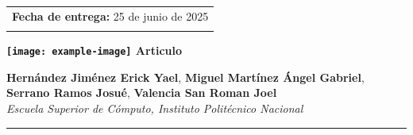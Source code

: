\documentclass[pdflatex,sn-mathphys-num]{sn-jnl}%
\theoremstyle{thmstyleone}%
\theoremstyle{thmstyletwo}%
\theoremstyle{thmstylethree}%
\begin{document}
\makeatletter
\def\@title{\parbox[t]{\textwidth}{\justifying\LARGE\bfseries Asistente inteligente de riego en tiempo real usando machine learning en un sistema embebido para reducir los costos por consumo de agua}}
\makeatother


\vspace{1cm}

\noindent


\begin{otherlanguage}{english}
\maketitle


\vspace{0.1cm} %

\noindent
\begin{minipage}[t]{0.36\textwidth}
\raggedright
\setlength{\tabcolsep}{0pt}
\renewcommand{\arraystretch}{1.8}

\begin{tabular}{@{}l@{}}
\textbf{Fecha de entrega:} 25 de junio de 2025 \\
\\
\end{tabular}

\vspace{0.2cm}

\textbf{\texttt{[image: example-image]}\hspace{0.3em} Articulo }
\end{minipage}
\hfill
\begin{minipage}[t]{0.6\textwidth}
\raggedright
{\normalsize
\vspace{0.1cm}
\textbf{Hernández Jiménez Erick Yael}, 
\textbf{Miguel Martínez Ángel Gabriel}, 
\textbf{Serrano Ramos Josué}, 
\textbf{Valencia San Roman Joel} \\[0.3em]
\textit{Escuela Superior de Cómputo, Instituto Politécnico Nacional}
}

\vspace{0.3em}

\hrule
\vspace{0.3em}


\end{minipage}
\end{otherlanguage}
\end{document}
